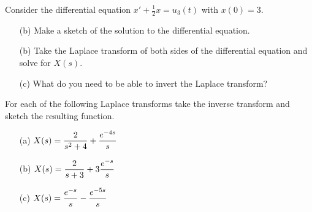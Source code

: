 \begin{problem}\label{prob:laplace_ode_shift}
    Consider the differential equation $x'+ \frac{1}{2}x = u_3(t)$ with $x(0) = 3$.  
    \begin{enumerate}
        \item[(b)] Make a sketch of the solution to the differential equation.
        \item[(b)] Take the Laplace transform of both sides of the differential equation
            and solve for $X(s)$.
        \item[(c)] What do you need to be able to invert the Laplace transform?
    \end{enumerate}
\end{problem}


\begin{problem}
    For each of the following Laplace transforms take the inverse transform and sketch the
    resulting function.
    \begin{enumerate}
        \item[(a)] $\displaystyle X(s) = \frac{2}{s^2 + 4} + \frac{e^{-4s}}{s}$
            \solution{
                \[ x(t) = \sin(2t) + u_4(t) \]
            }
        \item[(b)] $\displaystyle X(s) = \frac{2}{s+3} + 3\frac{e^{-s}}{s}$
            \solution{
                \[ x(t) = 2e^{-3t} + 3u_1(t) \]
            }
        \item[(c)] $\displaystyle X(s) = \frac{e^{-s}}{s} - \frac{e^{-5s}}{s}$
    \end{enumerate}

\end{problem}


